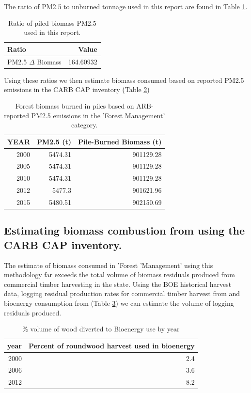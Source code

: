 \documentclass[a4paper,titlepage]{article}
\begin{document}
The ratio of \ac{PM2.5} to unburned tonnage used in this report are found in Table \ref{tab:pm_ratios}. 

\begin{table}[htb]
\centering
\begin{tabular}{lr}
Ratio & Value\\
\hline
\ac{PM2.5} \(\Delta\) Biomass & 164.60932\\
\end{tabular}
\caption{Ratio of piled biomass \ac{PM2.5} used in this report. \label{tab:pm_ratios}}

\end{table}


Using these ratios we then estimate biomass consumed based on reported \ac{PM2.5} emissions in the \ac{CARB} \ac{CAP} inventory (Table \ref{tab:cap_biomass})

\begin{table}[htb]
\centering
\begin{tabular}{rrr}
YEAR & PM2.5 (t) & Pile-Burned Biomass (t)\\
\hline
2000 & 5474.31 & 901129.28\\
2005 & 5474.31 & 901129.28\\
2010 & 5474.31 & 901129.28\\
2012 & 5477.3 & 901621.96\\
2015 & 5480.51 & 902150.69\\
\end{tabular}
\caption{Forest biomass burned in piles based on ARB-reported PM2.5 emissions in the 'Forest Management' category. \label{tab:cap_biomass}}

\end{table}

\subsection{Estimating biomass combustion from using the \acl{CARB} \acl{CAP} inventory.}
\label{sec:orgheadline6}
The estimate of biomass consumed in 'Forest 'Management' using this methodology far exceeds the total volume of biomass residuals produced from commercial timber harvesting in the state. Using the \ac{BOE} historical harvest data, logging residual production rates for commercial timber harvest from \cite{Morgan} and bioenergy consumption from \cite{Mciver2012} (Table \ref{tab:bio_vol}) we can estimate the volume of logging residuals produced.

\begin{table}[htb]
\centering
\begin{tabular}{rr}
year & Percent of roundwood harvest used in bioenergy\\
\hline
2000 & 2.4\\
2006 & 3.6\\
2012 & 8.2\\
\end{tabular}
\caption{\% volume of wood diverted to Bioenergy use by year \label{tab:bio_vol}}

\end{table}
\end{document}

